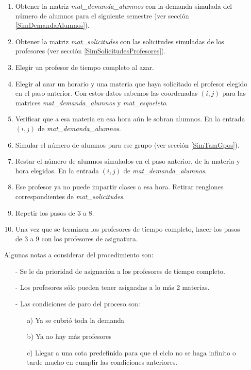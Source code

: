\begin{enumerate}
\item Obtener la matriz \textit{mat\_demanda\_alumnos} con la demanda simulada del número de alumnos para el siguiente semestre (ver sección \ref{SimDemandaAlumnos}).

\item Obtener la matriz \textit{mat\_solicitudes} con las solicitudes simuladas de los profesores (ver sección \ref{SimSolicitudesProfesores}).

\item Elegir un profesor de tiempo completo al azar.

\item Elegir al azar un horario y una materia que haya solicitado el profesor elegido en el paso anterior. Con estos datos sabemos las coordenadas $(i,j)$ para las matrices \textit{mat\_demanda\_alumnos} y \textit{mat\_esqueleto}.

\item Verificar que a esa materia en esa hora aún le sobran alumnos. En la entrada $(i,j)$ de \textit{mat\_demanda\_alumnos}.

\item Simular el número de alumnos para ese grupo (ver sección \ref{SimTamGpos}).

\item Restar el número de alumnos simulados en el paso anterior, de la materia y hora elegidas. En la entrada $(i,j)$ de \textit{mat\_demanda\_alumnos}.

\item Ese profesor ya no puede impartir clases a esa hora. Retirar renglones correspondientes de \textit{mat\_solicitudes}.

\item Repetir los pasos de 3 a 8.

\item Una vez que se terminen los profesores de tiempo completo, hacer los pasos de 3 a 9 con los profesores de asignatura.
\end{enumerate}

Algunas notas a considerar del procedimiento son:

\begin{itemize}
\item[-] Se le da prioridad de asignación a los profesores de tiempo completo.

\item[-] Los profesores sólo pueden tener asignadas a lo más 2 materias.

\item[-] Las condiciones de paro del proceso son:

\begin{itemize}
\item[a)] Ya se cubrió toda la demanda

\item[b)] Ya no hay más profesores

\item[c)] Llegar a una cota predefinida para que el ciclo no se haga infinito o tarde mucho en cumplir las condiciones anteriores.
\end{itemize}
\end{itemize}

